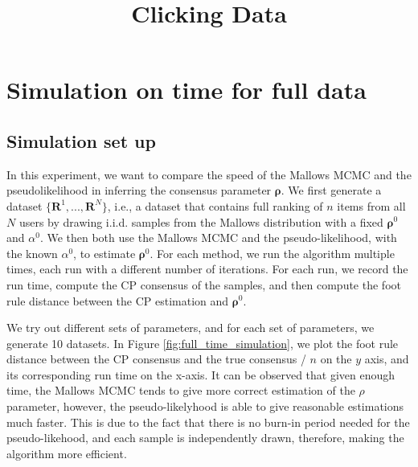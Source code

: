 \documentclass[11pt, oneside]{article}   	%
\title{Clicking Data}
\author{}
\date{}							%
\begin{document}
\maketitle

\section{Simulation on time for full data}
\subsection{Simulation set up}
In this experiment, we want to compare the speed of the Mallows MCMC and the pseudolikelihood in inferring the consensus parameter $\bm{\rho}$. We first generate a dataset $\{\bm{R}^1, ..., \bm{R}^N \}$, i.e., a dataset that contains full ranking of $n$ items from all $N$ users by drawing i.i.d. samples from the Mallows distribution with a fixed $\bm{\rho}^0$ and $\alpha^0$. We then both use the Mallows MCMC and the pseudo-likelihood, with the known $\alpha^0$, to estimate $\bm{\rho}^0$. For each method, we run the algorithm multiple times, each run with a different number of iterations. For each run, we record the run time, compute the CP consensus of the samples, and then compute the foot rule distance between the CP estimation and $\bm{\rho}^0$. 

We try out different sets of parameters, and for each set of parameters, we generate 10 datasets. In Figure \ref{fig:full_time_simulation}, we plot the foot rule distance between the CP consensus and the true consensus / $n$ on the $y$ axis, and its corresponding run time on the x-axis. It can be observed that given enough time, the Mallows MCMC tends to give more correct estimation of the $\rho$ parameter, however, the pseudo-likelyhood is able to give reasonable estimations much faster. This is due to the fact that there is no burn-in period needed for the pseudo-likehood, and each sample is independently drawn, therefore, making the algorithm more efficient.
\end{document}
